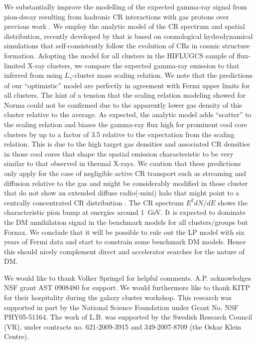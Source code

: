 \documentclass[10pt,aps,pra,reprint,amsmath,amsfonts,amssymb,showpacs,nofootinbib,floatfix]{revtex4-1}
\begin{document}
We substantially improve the modelling of the expected gamma-ray
signal from pion-decay resulting from hadronic CR interactions with
gas protons over previous work \citep{2010ApJ...717L..71A}. We employ
the analytic model of the CR spectrum and spatial distribution,
recently developed by \citet{2010MNRAS.409..449P} that is based on
cosmological hydrodynamical simulations that self-consistently follow
the evolution of CRs in cosmic structure formation. Adopting the model
for all clusters in the HIFLUGCS sample of flux-limited X-ray
clusters, we compare the expected gamma-ray emission to that inferred
from using $L_\gamma$-cluster mass scaling relation. We note that the
predictions of our ``optimistic'' model are perfectly in agreement
with Fermi upper limits for all clusters.  The hint of a tension that
the scaling relation modeling showed for Norma
\citep{2010ApJ...717L..71A} could not be confirmed due to the
apparently lower gas density of this cluster relative to the average.
As expected, the analytic model adds ``scatter'' to the scaling
relation and biases the gamma-ray flux high for prominent cool core
clusters by up to a factor of 3.5 relative to the expectation from the
scaling relation. This is due to the high target gas densities and
associated CR densities in those cool cores that shape the spatial
emission characteristic to be very similar to that observed in thermal
X-rays. We caution that these predictions only apply for the case of
negligible active CR transport such as streaming and diffusion
relative to the gas and might be considerably modified in those
cluster that do not show an extended diffuse radio(-mini) halo that
might point to a centrally concentrated CR distribution
\citep{2011A&A...527A..99E}. The CR spectrum $E^2 dN/dE$ shows the
characteristic pion bump at energies around 1~GeV. It is expected to
dominate the DM annihilation signal in the benchmark models for all
clusters/groups but Fornax. We conclude that it will be possible to
rule out the LP model with six years of Fermi data and start to
constrain some benchmark DM models. Hence this should nicely
complement direct and accelerator searches for the nature of DM.






\smallskip We would like to thank Volker Springel for helpful comments.
A.P. acknowledges NSF grant AST 0908480 for
support. We would furthermore like to thank KITP for their hospitality
during the galaxy cluster workshop.  This research was supported in
part by the National Science Foundation under Grant No. NSF
PHY05-51164. The work of L.B. was supported by the Swedish Research Council (VR), under contracts no. 621-2009-3915 and 349-2007-8709 (the Oskar Klein Centre).
\end{document}
